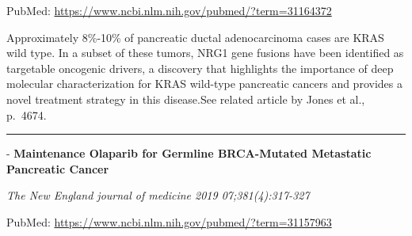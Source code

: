 \documentclass[]{article}
\begin{document}
PubMed: \url{https://www.ncbi.nlm.nih.gov/pubmed/?term=31164372}

Approximately 8\%-10\% of pancreatic ductal adenocarcinoma cases are
KRAS wild type. In a subset of these tumors, NRG1 gene fusions have been
identified as targetable oncogenic drivers, a discovery that highlights
the importance of deep molecular characterization for KRAS wild-type
pancreatic cancers and provides a novel treatment strategy in this
disease.See related article by Jones et al., p.~4674.

{}

{}

\begin{center}\rule{0.5\linewidth}{\linethickness}\end{center}

 - \textbf{Maintenance Olaparib for Germline BRCA-Mutated Metastatic
Pancreatic Cancer}

\emph{The New England journal of medicine 2019 07;381(4):317-327}

PubMed: \url{https://www.ncbi.nlm.nih.gov/pubmed/?term=31157963}
\end{document}
